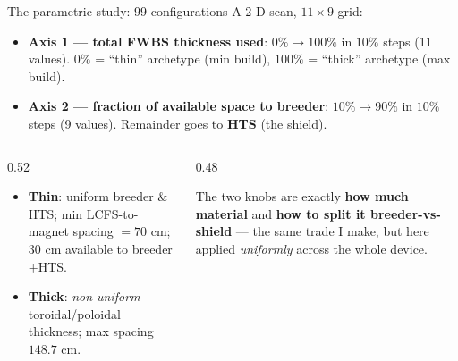\documentclass[aspectratio=169]{beamer}
\newcommand{\kb}[1]{\begin{tcolorbox}[colback=key!5,colframe=key!60,boxsep=2pt,left=4pt,right=4pt,top=3pt,bottom=3pt]#1\end{tcolorbox}}
\begin{document}
\begin{frame}{The parametric study: 99 configurations}
  A 2-D scan, $11\times9$ grid:
  \begin{itemize}
    \item \textbf{Axis 1 --- total FWBS thickness used}: $0\%\to100\%$ in $10\%$ steps (11 values). $0\%$ = ``thin'' archetype (min build), $100\%$ = ``thick'' archetype (max build).
    \item \textbf{Axis 2 --- fraction of available space to breeder}: $10\%\to90\%$ in $10\%$ steps (9 values). Remainder goes to \textbf{HTS} (the shield).
  \end{itemize}
  \begin{columns}[c]
    \begin{column}{0.52\textwidth}
      \begin{itemize}\small
        \item \textbf{Thin}: uniform breeder \& HTS; min LCFS-to-magnet spacing $= 70$ cm; $30$ cm available to breeder$+$HTS.
        \item \textbf{Thick}: \emph{non-uniform} toroidal/poloidal thickness; max spacing $148.7$ cm.
      \end{itemize}
    \end{column}
    \begin{column}{0.48\textwidth}
      \kb{\footnotesize The two knobs are exactly \textbf{how much material} and \textbf{how to split it breeder-vs-shield} --- the same trade I make, but here applied \emph{uniformly} across the whole device.}
    \end{column}
  \end{columns}
\end{frame}
\end{document}
